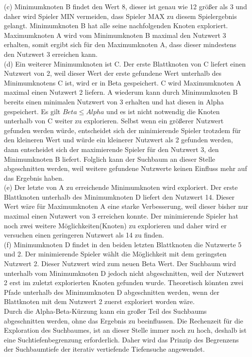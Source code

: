 (c) Minimumknoten B findet den Wert 8, dieser ist genau wie 12 größer als 3 und daher wird Spieler MIN vermeiden, dass Spieler MAX zu diesem Spielergebnis gelangt. Minimumknoten B hat alle seine nachfolgenden Knoten exploriert. Maximumknoten A wird vom Minimumknoten B maximal den Nutzwert 3 erhalten, somit ergibt sich für den Maximumknoten A, dass dieser mindestens den Nutzwert 3 erreichen kann. \\

(d) Ein weiterer Minimumknoten ist C. Der erste Blattknoten von C liefert einen Nutzwert von 2, weil dieser Wert der erste gefundene Wert unterhalb des Minimumknotens C ist, wird er in Beta gespeichert. C wird Maximumknoten A maximal einen Nutzwert 2 liefern. A wiederum kann durch Minimumknoten B bereits einen minimalen Nutzwert von 3 erhalten und hat diesen in Alpha gespeichert. Es gilt $Beta \leq Alpha$ und es ist nicht notwendig die Knoten unterhalb von C weiter zu explorieren. Selbst wenn ein größerer Nutzwert gefunden werden würde, entscheidet sich der minimierende Spieler trotzdem für den kleineren Wert und würde ein kleinerer Nutzwert als 2 gefunden werden, dann entscheidet sich der maximierende Spieler für den Nutzwert 3, den Minimumknoten B liefert. Folglich kann der Suchbaum an dieser Stelle abgeschnitten werden, weil weitere gefundene Nutzwerte keinen Einfluss mehr auf das Ergebnis haben. \\

(e) Der letzte von A zu erreichende Minimumknoten wird exploriert. Der erste Blattknoten unterhalb des Minimumknoten D liefert den Nutzwert 14. Dieser Wert wäre für Maximumknoten A eine starke Verbesserung, weil dieser bisher nur maximal einen Nutzwert von 3 erreichen konnte. Der minimierende Spieler hat noch zwei weitere Möglichkeiten(Knoten) zu explorieren und daher wird er versuchen einen geringeren Nutzwert als 14 zu finden. \\

(f) Minimumknoten D findet in den beiden letzten Blattknoten die Nutzwerte 5 und 2. Der minimierende Spieler wählt die Möglichkeit mit dem geringsten Nutzwert 2. Dieser Nutzwert wird zum neuen Beta Wert. Der Suchbaum wird unterhalb vom Minimumknoten D jedoch nicht abgeschnitten, weil der Nutzwert 2 erst im zuletzt explorierten Knoten gefunden wurde. Theoretisch könnten zwei Pfade unterhalb des Minimumknoten D abgeschnitten werden, wenn der Blattknoten mit dem Nutzwert 2 zuerst exploriert worden wäre.\\

Durch die Alpha-Beta-Kürzung kann ein großer Teil des Suchbaums abgeschnitten werden, ohne das Ergebnis zu beeinflussen. Die Rechenzeit für die Exploration des Suchbaumes, ist an dieser Stelle immer noch zu hoch, deshalb ist eine Suchtiefenbegrenzung erforderlich. Daher wird das Prinzip des Begrenzens der Suchbaumtiefe der iterativ vertiefende Tiefensuche angewendet. \\

